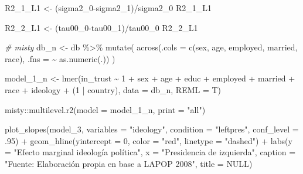 \documentclass[
  12pt,
  a4paper,
]{article}
\newenvironment{Shaded}{\begin{snugshade}}{\end{snugshade}}
\newcommand{\AttributeTok}[1]{\textcolor[rgb]{0.77,0.63,0.00}{#1}}
\newcommand{\CommentTok}[1]{\textcolor[rgb]{0.56,0.35,0.01}{\textit{#1}}}
\newcommand{\ConstantTok}[1]{\textcolor[rgb]{0.00,0.00,0.00}{#1}}
\newcommand{\DecValTok}[1]{\textcolor[rgb]{0.00,0.00,0.81}{#1}}
\newcommand{\FunctionTok}[1]{\textcolor[rgb]{0.00,0.00,0.00}{#1}}
\newcommand{\NormalTok}[1]{#1}
\newcommand{\OtherTok}[1]{\textcolor[rgb]{0.56,0.35,0.01}{#1}}
\newcommand{\SpecialCharTok}[1]{\textcolor[rgb]{0.00,0.00,0.00}{#1}}
\newcommand{\StringTok}[1]{\textcolor[rgb]{0.31,0.60,0.02}{#1}}
\begin{document}
\begin{Shaded}
\begin{Highlighting}[]
\NormalTok{R2\_1\_L1 }\OtherTok{\textless{}{-}}\NormalTok{ (sigma2\_0}\SpecialCharTok{{-}}\NormalTok{sigma2\_1)}\SpecialCharTok{/}\NormalTok{sigma2\_0}
\NormalTok{R2\_1\_L1}

\NormalTok{R2\_2\_L1 }\OtherTok{\textless{}{-}}\NormalTok{ (tau00\_0}\SpecialCharTok{{-}}\NormalTok{tau00\_1)}\SpecialCharTok{/}\NormalTok{tau00\_0}
\NormalTok{R2\_2\_L1}

\CommentTok{\# misty}
\NormalTok{db\_n }\OtherTok{\textless{}{-}}\NormalTok{ db }\SpecialCharTok{\%\textgreater{}\%} 
  \FunctionTok{mutate}\NormalTok{(}
    \FunctionTok{across}\NormalTok{(}\AttributeTok{.cols =} \FunctionTok{c}\NormalTok{(sex, age, employed, married, race),}
           \AttributeTok{.fns =} \SpecialCharTok{\textasciitilde{}} \FunctionTok{as.numeric}\NormalTok{(.))}
\NormalTok{  )}
 

\NormalTok{model\_1\_n }\OtherTok{\textless{}{-}} \FunctionTok{lmer}\NormalTok{(in\_trust }\SpecialCharTok{\textasciitilde{}} \DecValTok{1} \SpecialCharTok{+}\NormalTok{ sex }\SpecialCharTok{+}\NormalTok{ age }\SpecialCharTok{+}\NormalTok{ educ }\SpecialCharTok{+}\NormalTok{ employed }\SpecialCharTok{+}\NormalTok{ married }\SpecialCharTok{+}
\NormalTok{                race }\SpecialCharTok{+}\NormalTok{ ideology }\SpecialCharTok{+}\NormalTok{ (}\DecValTok{1} \SpecialCharTok{|}\NormalTok{ country),}
                \AttributeTok{data =}\NormalTok{ db\_n, }
                \AttributeTok{REML =}\NormalTok{ T)}

\NormalTok{misty}\SpecialCharTok{::}\FunctionTok{multilevel.r2}\NormalTok{(}\AttributeTok{model =}\NormalTok{ model\_1\_n, }\AttributeTok{print =} \StringTok{"all"}\NormalTok{)}


\FunctionTok{plot\_slopes}\NormalTok{(model\_3, }
            \AttributeTok{variables =} \StringTok{"ideology"}\NormalTok{, }
            \AttributeTok{condition =} \StringTok{"leftpres"}\NormalTok{,}
            \AttributeTok{conf\_level =}\NormalTok{ .}\DecValTok{95}\NormalTok{) }\SpecialCharTok{+}
  \FunctionTok{geom\_hline}\NormalTok{(}\AttributeTok{yintercept =} \DecValTok{0}\NormalTok{, }
             \AttributeTok{color =} \StringTok{"red"}\NormalTok{, }
             \AttributeTok{linetype =} \StringTok{"dashed"}\NormalTok{) }\SpecialCharTok{+}
  \FunctionTok{labs}\NormalTok{(}\AttributeTok{y =} \StringTok{"Efecto marginal ideología política"}\NormalTok{,}
       \AttributeTok{x =} \StringTok{"Presidencia de izquierda"}\NormalTok{,}
       \AttributeTok{caption =} \StringTok{"Fuente: Elaboración propia en base a LAPOP 2008"}\NormalTok{,}
       \AttributeTok{title =} \ConstantTok{NULL}\NormalTok{)}



\end{Highlighting}
\end{Shaded}
\end{document}
